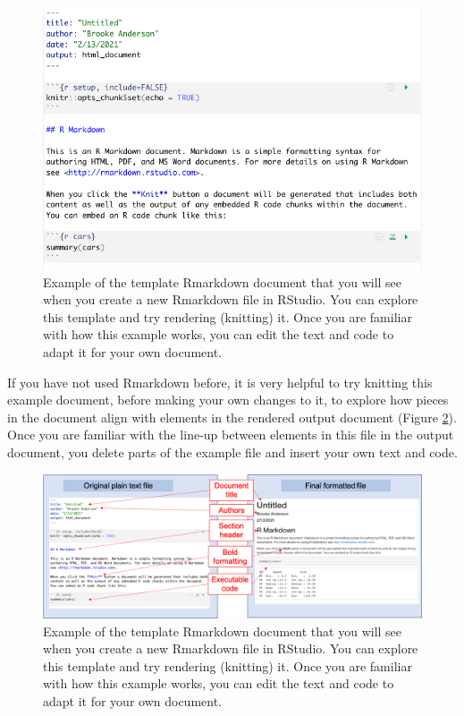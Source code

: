\documentclass[]{tufte-book}
\begin{document}
\begin{figure}
\includegraphics[width=\textwidth]{figures/rmarkdown_template} \caption[Example of the template Rmarkdown document that you will see when you create a new Rmarkdown file in RStudio]{Example of the template Rmarkdown document that you will see when you create a new Rmarkdown file in RStudio. You can explore this template and try rendering (knitting) it. Once you are familiar with how this example works, you can edit the text and code to adapt it for your own document.}\label{fig:rmarkdowntemplate}
\end{figure}

If you have not used Rmarkdown before, it is very helpful to try knitting this
example document, before making your own changes to it, to explore how pieces in
the document align with elements in the rendered output document (Figure
\ref{fig:rmarkdownoriginalfinal}). Once you are familiar with the line-up
between elements in this file in the output document, you delete parts of the
example file and insert your own text and code.

\begin{figure}
\includegraphics[width=\textwidth]{figures/rmarkdownoriginalfinal} \caption[Example of the template Rmarkdown document that you will see when you create a new Rmarkdown file in RStudio]{Example of the template Rmarkdown document that you will see when you create a new Rmarkdown file in RStudio. You can explore this template and try rendering (knitting) it. Once you are familiar with how this example works, you can edit the text and code to adapt it for your own document.}\label{fig:rmarkdownoriginalfinal}
\end{figure}
\end{document}
